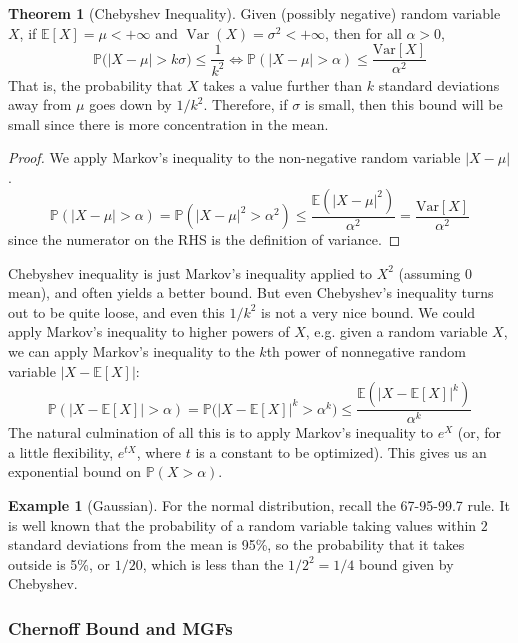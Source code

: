 \documentclass{article}
\DeclareMathOperator{\Var}{Var}
\theoremstyle{definition}
\newtheorem{theorem}{Theorem}[section]
\newtheorem{example}{Example}[section]
\theoremstyle{remark}
\theoremstyle{definition}
\begin{document}
\begin{theorem}[Chebyshev Inequality]
Given (possibly negative) random variable $X$, if $\mathbb{E}[X] = \mu < +\infty$ and $\Var(X) = \sigma^2 < +\infty$, then for all $\alpha > 0$, 
\[\mathbb{P} \big( |X - \mu| > k \sigma \big) \leq \frac{1}{k^2} \iff \mathbb{P}(|X - \mu| > \alpha) \leq \frac{\mathrm{Var}[X]}{\alpha^2}\]
That is, the probability that $X$ takes a value further than $k$ standard deviations away from $\mu$ goes down by $1/k^2$. Therefore, if $\sigma$ is small, then this bound will be small since there is more concentration in the mean. 
\end{theorem}
\begin{proof}
We apply Markov's inequality to the non-negative random variable $|X - \mu|$. 
\[\mathbb{P}(|X - \mu| > \alpha) = \mathbb{P}(|X - \mu|^2 > \alpha^2) \leq \frac{\mathbb{E}(|X - \mu|^2)}{\alpha^2} = \frac{\mathrm{Var}[X]}{\alpha^2}\]
since the numerator on the RHS is the definition of variance. 
\end{proof}

Chebyshev inequality is just Markov's inequality applied to $X^2$ (assuming $0$ mean), and often yields a better bound. But even Chebyshev's inequality turns out to be quite loose, and even this $1/k^2$ is not a very nice bound. We could apply Markov's inequality to higher powers of $X$, e.g. given a random variable $X$, we can apply Markov's inequality to the $k$th power of nonnegative random variable $|X - \mathbb{E}[X]|$: 
\[\mathbb{P} (|X - \mathbb{E}[X] | > \alpha) = \mathbb{P}\big( |X - \mathbb{E}[X] |^k > \alpha^k \big) \leq \frac{\mathbb{E}( |X - \mathbb{E}[X] |^k )}{\alpha^k}\]
The natural culmination of all this is to apply Markov's inequality to $e^X$ (or, for a little flexibility, $e^{t X}$, where $t$ is a constant to be optimized). This gives us an exponential bound on $\mathbb{P}(X > \alpha)$. 

\begin{example}[Gaussian]
For the normal distribution, recall the 67-95-99.7 rule. It is well known that the probability of a random variable taking values within $2$ standard deviations from the mean is 95\%, so the probability that it takes outside is 5\%, or $1/20$, which is less than the $1/2^2 = 1/4$ bound given by Chebyshev. 
\end{example}

\subsubsection{Chernoff Bound and MGFs}
\end{document}
